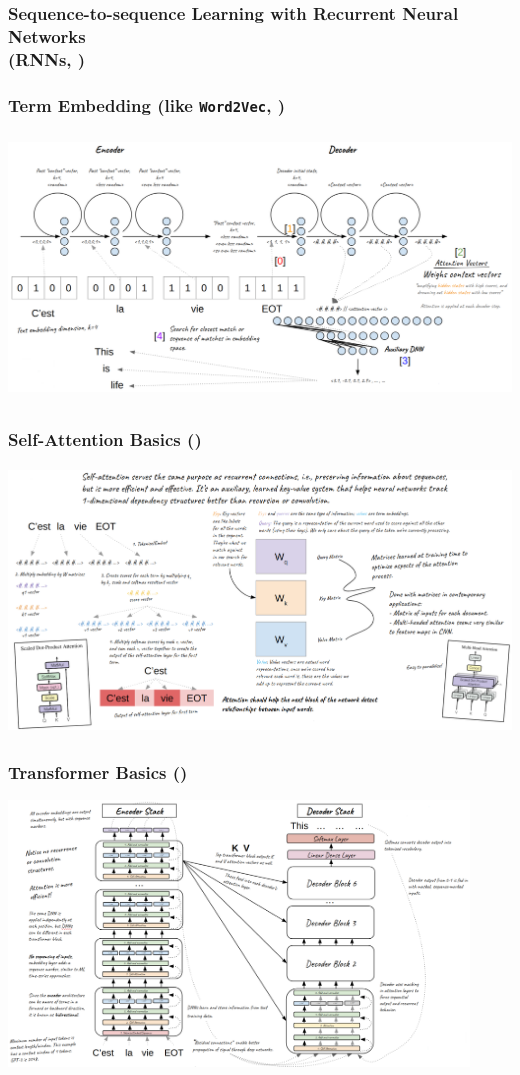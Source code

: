 \documentclass[11pt,
               aspectratio=169,
               hyperref={colorlinks}
               ]{beamer}
\begin{document}
		\begin{frame}
			\frametitle{\small{Sequence-to-sequence Learning with Recurrent Neural Networks\\ (RNNs, \cite{NIPS2014_a14ac55a})}}
			\frametitle{Term Embedding (like \texttt{Word2Vec}, \cite{NIPS2013_9aa42b31})}
			\centering
			\includegraphics[height=200pt]{../img/rnn.png}
		\end{frame}		

		\begin{frame}
			\frametitle{Self-Attention Basics (\cite{NIPS2017_3f5ee243})}
			\centering
			\includegraphics[height=200pt]{../img/attn.png}
		\end{frame}	
		
		\begin{frame}
			\frametitle{Transformer Basics (\cite{NIPS2017_3f5ee243})}
			\centering
			\includegraphics[height=200pt]{../img/trans.png}
		\end{frame}
		
\end{document}
